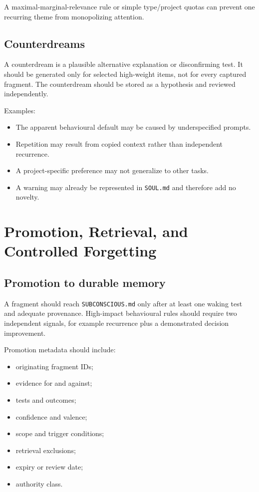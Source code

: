\documentclass[11pt,a4paper]{article}
\begin{document}
A maximal-marginal-relevance rule or simple type/project quotas can prevent one recurring theme from monopolizing attention.

\subsection{Counterdreams}

A counterdream is a plausible alternative explanation or disconfirming test. It should be generated only for selected high-weight items, not for every captured fragment. The counterdream should be stored as a hypothesis and reviewed independently.

Examples:

\begin{itemize}
  \item The apparent behavioural default may be caused by underspecified prompts.
  \item Repetition may result from copied context rather than independent recurrence.
  \item A project-specific preference may not generalize to other tasks.
  \item A warning may already be represented in \texttt{SOUL.md} and therefore add no novelty.
\end{itemize}

\section{Promotion, Retrieval, and Controlled Forgetting}

\subsection{Promotion to durable memory}

A fragment should reach \texttt{SUBCONSCIOUS.md} only after at least one waking test and adequate provenance. High-impact behavioural rules should require two independent signals, for example recurrence plus a demonstrated decision improvement.

Promotion metadata should include:

\begin{itemize}
  \item originating fragment IDs;
  \item evidence for and against;
  \item tests and outcomes;
  \item confidence and valence;
  \item scope and trigger conditions;
  \item retrieval exclusions;
  \item expiry or review date;
  \item authority class.
\end{itemize}
\end{document}
